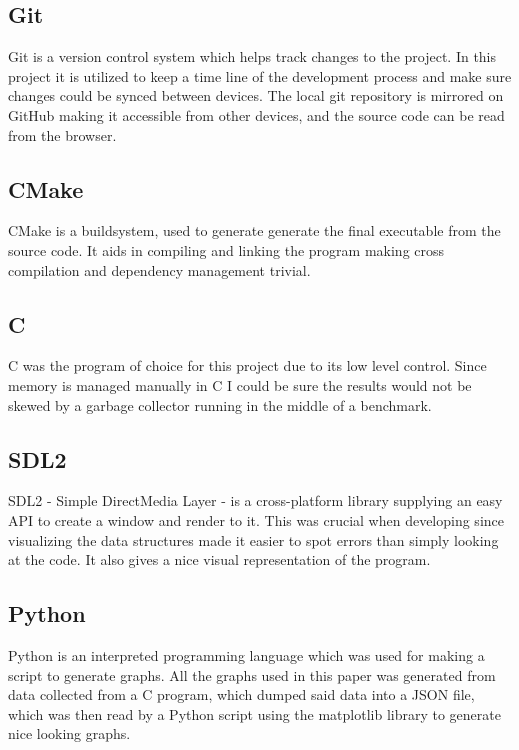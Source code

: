 \documentclass[a4paper, 12pt]{article}
\begin{document}
\subsection{Git}
Git is a version control system which helps track changes to the project. In
this project it is utilized to keep a time line of the development process and
make sure changes could be synced between devices. The local git repository is
mirrored on GitHub making it accessible from other devices, and the source code
can be read from the browser.

\subsection{CMake}
CMake is a buildsystem, used to generate generate the final executable from the
source code. It aids in compiling and linking the program making cross
compilation and dependency management trivial.

\subsection{C}
C was the program of choice for this project due to its low level control.
Since memory is managed manually in C I could be sure the results would not be
skewed by a garbage collector running in the middle of a benchmark.

\subsection{SDL2}
SDL2 - Simple DirectMedia Layer - is a cross-platform library supplying an easy
API to create a window and render to it. This was crucial when developing since
visualizing the data structures made it easier to spot errors than simply
looking at the code. It also gives a nice visual representation of the program.

\subsection{Python}
Python is an interpreted programming language which was used for making a script
to generate graphs. All the graphs used in this paper was generated from data
collected from a C program, which dumped said data into a JSON file, which was
then read by a Python script using the matplotlib library to generate nice
looking graphs.

\newpage
\end{document}
